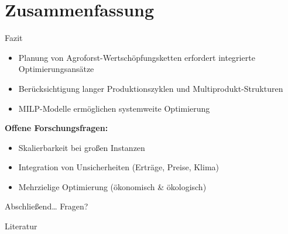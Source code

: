 \documentclass[10pt,aspectratio=169]{beamer}
\begin{document}

\section{Zusammenfassung}

\begin{frame}{Fazit}
  \begin{itemize}\itemsep1ex
    \item Planung von Agroforst-Wertsch\"opfungsketten erfordert integrierte Optimierungsans\"atze
    \item Ber\"ucksichtigung langer Produktionszyklen und Multiprodukt-Strukturen
    \item[$\rightarrow$] MILP-Modelle erm\"oglichen systemweite Optimierung
  \end{itemize}
  \vspace{2ex}
  \textbf{Offene Forschungsfragen:}
  \begin{itemize}
    \item Skalierbarkeit bei gro\ss{}en Instanzen
    \item Integration von Unsicherheiten (Ertr\"age, Preise, Klima)
    \item Mehrzielige Optimierung (\"okonomisch \& \"okologisch)
  \end{itemize}
\end{frame}

\begin{frame}{Abschlie\ss{}end\ldots}
  \vspace{10ex}
  \vfill\LARGE
  Fragen?\\[5ex]
  \vfill
\end{frame}

\appendix
\begin{frame}{Literatur}
  \tiny
  
  
\end{frame}
\end{document}
